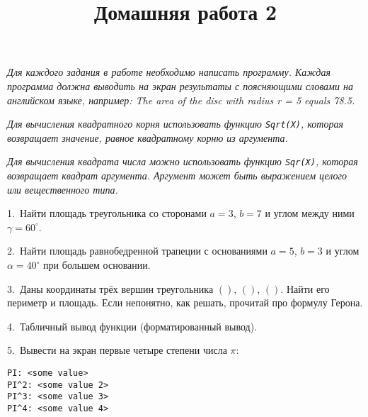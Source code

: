 \documentclass[12pt,russian,draft]{article}
\title{Домашняя работа 2}
\date{}
\begin{document}
\maketitle{}

\emph{Для каждого задания в работе необходимо написать программу. Каждая
    программа должна выводить на экран результаты с поясняющими словами на
    английском языке, например: The area of the disc with radius r = 5 equals
    78.5.}

\emph{Для вычисления квадратного корня использовать функцию \texttt{Sqrt(X)},
    которая возвращает значение, равное квадратному корню из аргумента.}

\emph{Для вычисления квадрата числа можно использовать функцию \texttt{Sqr(X)},
    которая возвращает квадрат аргумента. Аргумент может быть выражением целого
    или вещественного типа.}

1.\ Найти площадь треугольника со сторонами $ a = 3 $, $ b = 7 $ и углом между
ними $ \gamma = 60^{\circ} $.

2.\ Найти площадь равнобедренной трапеции с основаниями $ a = 5 $, $ b = 3 $ и
углом $ \alpha = 40^{\circ} $ при большем основании.

3.\ Даны координаты трёх вершин треугольника $ () $, $ () $, $ () $. Найти его
периметр и площадь. Если непонятно, как решать, прочитай про формулу Герона.

4.\ Табличный вывод функции (форматированный вывод).

5.\ Вывести на экран первые четыре степени числа $ \pi $:
\begin{lstlisting}
PI: <some value>
PI^2: <some value 2>
PI^3: <some value 3>
PI^4: <some value 4>
\end{lstlisting}
\end{document}
